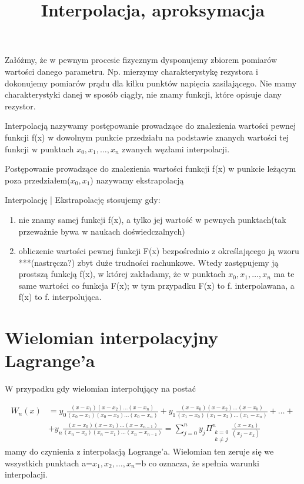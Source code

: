 \documentclass[10pt, a4paper]{article}
\title{\textbf{Interpolacja, aproksymacja}}
\author{}
\date{}
\begin{document}
\maketitle

Załóżmy, że w pewnym procesie fizycznym dysponujemy zbiorem pomiarów wartości danego parametru. Np. mierzymy charakterystykę rezystora i dokonujemy pomiarów prądu dla kilku punktów napięcia zasilającego. Nie mamy charakterystyki danej w sposób ciągły, nie znamy funkcji, które opisuje dany rezystor.

Interpolacją nazywamy postępowanie prowadzące do znalezienia wartości pewnej funkcji f(x) w dowolnym punkcie przedziału na podstawie znanych wartości tej funkcji w punktach $x_0, x_1,\dots,x_n$ zwanych węzłami interpolacji.

Postępowanie prowadzące do znalezienia wartości funkcji f(x) w punkcie leżącym poza przedziałem($x_0,x_1$) nazywamy ekstrapolacją

Interpolację | Ekstrapolację stosujemy gdy:

\begin{enumerate}
\item nie znamy samej funkcji f(x), a tylko jej wartość w pewnych punktach(tak przeważnie bywa w naukach doświedczalnych)
\item obliczenie wartości pewnej funkcji F(x) bezpośrednio z określającego ją wzoru ***(nastręcza?) zbyt duże trudności rachunkowe. Wtedy zastępujemy ją prostszą funkcją f(x), w której zakładamy, że w punktach $x_0, x_1, \dots, x_n$ ma te same wartości co funkcja F(x); w tym przypadku F(x) to f. interpolawana, a f(x) to f. interpolująca.
\end{enumerate}

\section*{Wielomian interpolacyjny Lagrange'a}

W przypadku gdy wielomian interpolujący na postać

\begin{align*}
W_n(x)&=y_0\frac{(x-x_1)(x-x_2)\dots(x-x_n)}{(x_0-x_1)(x_0-x_2)\dots(x_0-x_n)}+y_1\frac{(x-x_0)(x-x_2)\dots(x-x_b)}{(x_1-x_0)(x_1-x_2)\dots(x_1-x_n)}+\dots+\\
&+y_n\frac{(x-x_0)(x-x_1)\dots(x-x_{n-1})}{(x_n-x_0)(x_n-x_1)\dots(x_n-x_{n-1})}=\sum_{j=0}^ny_j\displaystyle\Pi_{\substack{k=0\\k\neq j}}^n\frac{(x-x_k)}{(x_j-x_k)}
\end{align*}
mamy do czynienia z interpolacją Logrange'a. Wielomian ten zeruje się we wszystkich punktach a=$x_1, x_2, \dots, x_n$=b co oznacza, że spełnia warunki interpolacji.
\end{document}
